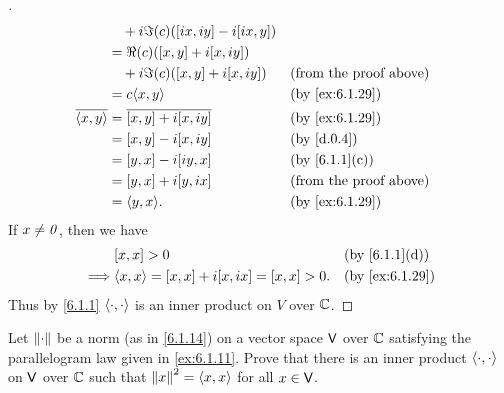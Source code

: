 \begin{proof}[]
\begin{align*}
                      & \quad + i \Im(c) ([ix, iy] - i[ix, y])                                                         \\
                      & = \Re(c) ([x, y] + i[x, iy])                                                                   \\
                      & \quad + i \Im(c) ([x, y] + i[x, iy])                        &  & \text{(from the proof above)} \\
                      & = c \inn{x, y}                                              &  & \by{ex:6.1.29}                \\
    \conj{\inn{x, y}} & = \conj{[x, y] + i[x, iy]}                                  &  & \by{ex:6.1.29}                \\
                      & = [x, y] - i[x, iy]                                         &  & \by{d.0.4}                    \\
                      & = [y, x] - i[iy, x]                                         &  & \by{6.1.1}[c]                 \\
                      & = [y, x] + i[y, ix]                                         &  & \text{(from the proof above)} \\
                      & = \inn{y, x}.                                               &  & \by{ex:6.1.29}
  \end{align*}
  If \(x \neq \mathit{0}\), then we have
  \begin{align*}
             & [x, x] > 0                                   &  & \by{6.1.1}[d]  \\
    \implies & \inn{x, x} = [x, x] + i[x, ix] = [x, x] > 0. &  & \by{ex:6.1.29}
  \end{align*}
  Thus by \cref{6.1.1} \(\left\langle\cdot, \cdot\right\rangle\) is an inner product on \(V\) over \(\mathbb{C}\).
\end{proof}

\begin{ex}\label{ex:6.1.30}
  Let \(\left\lVert\cdot\right\rVert\) be a norm (as in \cref{6.1.14}) on a vector space \(\mathsf{V}\) over \(\mathbb{C}\) satisfying the parallelogram law given in \cref{ex:6.1.11}.
  Prove that there is an inner product \(\left\langle\cdot, \cdot\right\rangle\) on \(\mathsf{V}\) over \(\mathbb{C}\) such that \(\left\lVert x\right\rVert^2 = \left\langle x, x\right\rangle\) for all \(x \in \mathsf{V}\).
\end{ex}

